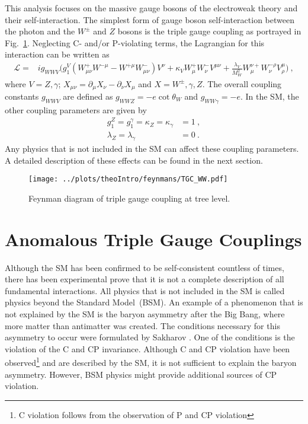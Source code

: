 \noindent This analysis focuses on the massive gauge bosons of the electroweak theory and their self-interaction. The simplest form of gauge boson self-interaction between  the photon and the $W^\pm$ and $Z$ bosons is the triple gauge coupling as portrayed in Fig.~\ref{fig:theo:tgc}. Neglecting C- and/or P-violating terms, the Lagrangian for this interaction can be written as \cite{EFT}
\begin{align}
\mathcal{L} =& ig_{WWV}\Big( g_1^V(W_{\mu\nu}^+W^{-\mu} - W^{+\mu}W_{\mu\nu}^-)V^{\nu} + \kappa_VW_\mu^+W_\nu^-V^{\mu\nu}  + \frac{\lambda_V}{M_W^2}W_\mu^{\nu+}W_\nu^{-\rho}V_\rho^\mu  \Big) ~, \label{eq:theo:EWKlag}
\end{align}
where $V=Z,\gamma$; $X_{\mu\nu}=\partial_\mu X_\nu -\partial_\nu X_\mu$ and $X=W^\pm,\gamma ,Z$. The overall coupling constants $g_{WWV}$ are defined as $g_{WWZ} = -e \cot \theta_W$ and $g_{WW\gamma} =-e$. In the SM, the other coupling parameters are given by
\begin{align}
g_1^Z = g_1^\gamma = \kappa_Z = \kappa_\gamma &= 1 ~, \\
\lambda_Z = \lambda_\gamma &= 0 ~.
\end{align}
Any physics that is not included in the SM can affect these coupling parameters. A detailed description of these effects can be found in the next section.
\begin{figure}
	\centering
	\texttt{[image: ../plots/theoIntro/feynmans/TGC\_WW.pdf]}
	\caption[Feynman diagram of triple gauge coupling at tree level]{Feynman diagram of triple gauge coupling at tree level.}
	\label{fig:theo:tgc}
\end{figure}

\section{Anomalous Triple Gauge Couplings}
\label{sec:aTGC}
Although the SM has been confirmed to be self-consistent countless of times, there has been experimental prove that it is not a complete description of all fundamental interactions. All physics that is not included in the SM is called physics beyond the Standard Model~(BSM). An example of a phenomenon that is not explained by the SM is the baryon asymmetry after the Big Bang, where more matter than antimatter was created. The conditions necessary for this asymmetry to occur were formulated by Sakharov \cite{sakharov}. One of the conditions is the violation of the C and CP invariance. Although C and CP violation have been observed\footnote{C violation follows from the observation of P \cite{wu} and CP violation}\cite{CP} and are described by the SM, it is not sufficient to explain the baryon asymmetry. However, BSM physics might provide additional sources of CP violation.\\

